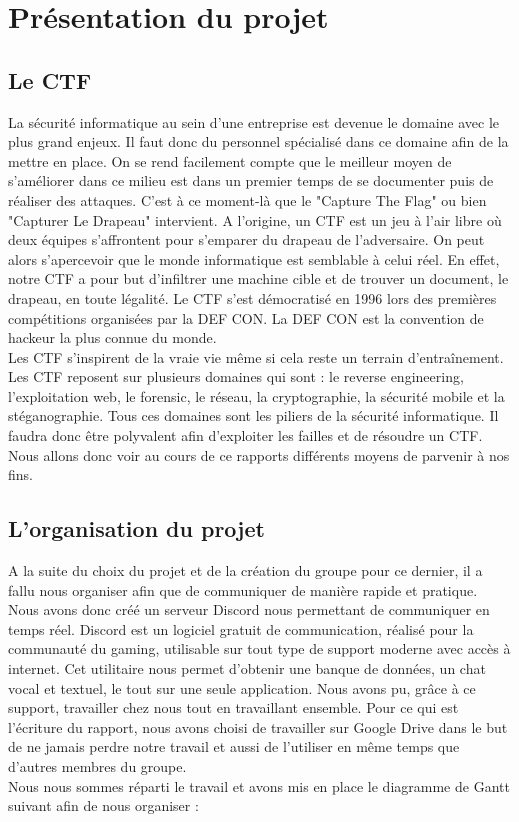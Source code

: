 \chapter{Présentation du projet}
\label{chap:Mini Projet}

\section{Le CTF}
La sécurité informatique au sein d’une entreprise est devenue le domaine avec le plus grand enjeux. Il faut donc du personnel spécialisé dans ce domaine afin de la mettre en place. On se rend facilement compte que le meilleur moyen de s’améliorer dans ce milieu est dans un premier temps de se documenter puis de réaliser des attaques. C’est à ce moment-là que le "Capture The Flag" ou bien "Capturer Le Drapeau" intervient. A l’origine, un CTF est un jeu à l’air libre où deux équipes s’affrontent pour s’emparer du drapeau de l’adversaire. On peut alors s’apercevoir que le monde informatique est semblable à celui réel. En effet, notre CTF a pour but d’infiltrer une machine cible et de trouver un document, le drapeau, en toute légalité. Le CTF s’est démocratisé en 1996 lors des premières compétitions organisées par la DEF CON. La DEF CON est la convention de hackeur la plus connue du monde. \\
Les CTF s’inspirent de la vraie vie même si cela reste un terrain d'entraînement. Les CTF reposent sur plusieurs domaines qui sont : le reverse engineering, l’exploitation web, le forensic, le réseau, la cryptographie, la sécurité mobile et la stéganographie.
Tous ces domaines sont les piliers de la sécurité informatique. Il faudra donc être polyvalent afin d’exploiter les failles et de résoudre un CTF. Nous allons donc voir au cours de ce rapports différents moyens de parvenir à nos fins.

\newpage
\section{L'organisation du projet}
A la suite du choix du projet et de la création du groupe pour ce dernier, il a fallu nous organiser afin que de communiquer de manière rapide et pratique. Nous avons donc créé un serveur Discord nous permettant de communiquer en temps réel. Discord est un logiciel gratuit de communication, réalisé pour la communauté du gaming, utilisable sur tout type de support moderne avec accès à internet. Cet utilitaire nous permet d’obtenir une banque de données, un chat vocal et textuel, le tout sur une seule application. Nous avons pu, grâce à ce support, travailler chez nous tout en travaillant ensemble.
Pour ce qui est l’écriture du rapport, nous avons choisi de travailler sur Google Drive dans le but de ne jamais perdre notre travail et aussi de l’utiliser en même temps que d’autres membres du groupe.
\\
Nous nous sommes réparti le travail et avons mis en place le diagramme de Gantt suivant afin de nous organiser :

